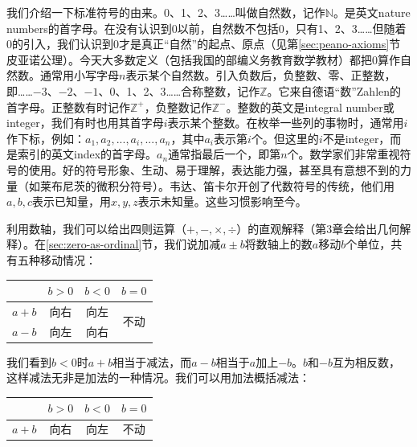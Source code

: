 \documentclass[b5paper]{ctexart}
\begin{document}
\begin{center}
\end{center}

我们介绍一下标准符号的由来。0、1、2、3……叫做自然数，记作$\mathbb{N}$。是英文nature numbers的首字母。在没有认识到0以前，自然数不包括0，只有1、2、3……但随着0的引入，我们认识到0才是真正“自然”的起点、原点（见第\ref{sec:peano-axioms}节皮亚诺公理）。今天大多数定义（包括我国的部编义务教育数学教材）都把0算作自然数。通常用小写字母$n$表示某个自然数。引入负数后，负整数、零、正整数，即……$-3$、$-2$、$-1$、0、1、2、3……合称整数，记作$\mathbb{Z}$。它来自德语“数”Zahlen的首字母。正整数有时记作$\mathbb{Z}^+$，负整数记作$\mathbb{Z}^-$。整数的英文是integral number或integer，我们有时也用其首字母$i$表示某个整数。在枚举一些列的事物时，通常用$i$作下标，例如：$a_1, a_2, ..., a_i, ..., a_n$，其中$a_i$表示第$i$个。但这里的$i$不是integer，而是索引的英文index的首字母。$a_n$通常指最后一个，即第$n$个。数学家们非常重视符号的使用。好的符号形象、生动、易于理解，表达能力强，甚至具有意想不到的力量（如莱布尼茨的微积分符号）。韦达、笛卡尔开创了代数符号的传统，他们用$a, b, c$表示已知量，用$x, y, z$表示未知量。这些习惯影响至今。

利用数轴，我们可以给出四则运算（$+, -, \times, \div$）的直观解释（第3章会给出几何解释）。在\ref{sec:zero-as-ordinal}节，我们说加减$a \pm b$将数轴上的数$a$移动$b$个单位，共有五种移动情况：

\begin{center}
  \begin{tabular}{c|c|c|c}
          & $b > 0$ & $b < 0$ & $b = 0$ \\
  \hline
  $a + b$ & 向右     & 向左    & \multirow{2}{*}{不动} \\
  \cline{1-3}
  $a - b$ & 向左     & 向右
  \end{tabular}
\end{center}

我们看到$b < 0$时$a + b$相当于减法，而$a - b$相当于$a$加上$-b$。$b$和$-b$互为相反数，这样减法无非是加法的一种情况。我们可以用加法概括减法：

\begin{center}
\begin{tabular}{c|c|c|c}
        & $b > 0$ & $b < 0$ & $b = 0$ \\
\hline
$a + b$ & 向右     & 向左    & 不动
\end{tabular}
\end{center}
\end{document}
